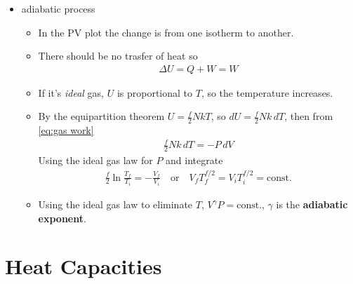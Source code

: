 \documentclass{book}
\begin{document}
\begin{itemize}
	\item adiabatic process
	      \begin{itemize}
		      \item In the PV plot the change is from one isotherm to another.
		      \item There should be no trasfer of heat so
		            \begin{align}
			            \Delta{U} = Q+W = W
		            \end{align}
		      \item If it's \textit{ideal} gas, $U$ is proportional to $T$, so the
		            temperature increases.
		      \item By the equipartition theorem $U = \frac{f}{2} NkT$, so $dU = \frac{f}{2} Nk\, dT$,
		            then from \eqref{eq:gas work}
		            \begin{align}
			            \frac{f}{2} Nk \, dT = -P\, dV
		            \end{align}
		            Using the ideal gas law for $P$ and integrate
		            \begin{align}
			            \frac{f}{2} \ln{\frac{T_{f}}{T_{i}}} = - {\frac{V_{f}}{V_{i}}} \quad \text{or} \quad
			            V_{f} T_{f}^{f/2} = V_{i} T_{i}^{f/2} = \text{const.}
		            \end{align}
		      \item Using the ideal gas law to eliminate $T$, $V^{\gamma}P = \text{const.}$,
		            $\gamma$ is the \textbf{adiabatic exponent}.
	      \end{itemize}
\end{itemize}


\section{Heat Capacities}%
\label{sec:Heat Capacities}
\end{document}

